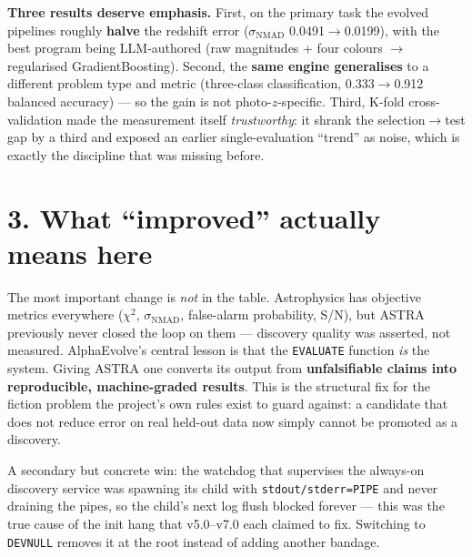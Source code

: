 \documentclass[11pt]{article}
\begin{document}
\textbf{Three results deserve emphasis.} First, on the primary task the evolved
pipelines roughly \textbf{halve} the redshift error ($\sigma_{\mathrm{NMAD}}$
0.0491$\rightarrow$0.0199), with the best program being LLM-authored (raw
magnitudes + four colours $\rightarrow$ regularised GradientBoosting). Second,
the \textbf{same engine generalises} to a different problem type and metric
(three-class classification, 0.333$\rightarrow$0.912 balanced accuracy) --- so
the gain is not photo-$z$-specific. Third, K-fold cross-validation made the
measurement itself \emph{trustworthy}: it shrank the selection$\rightarrow$test
gap by a third and exposed an earlier single-evaluation ``trend'' as noise,
which is exactly the discipline that was missing before.

\section*{3. What ``improved'' actually means here}
The most important change is \emph{not} in the table. Astrophysics has objective
metrics everywhere ($\chi^{2}$, $\sigma_{\mathrm{NMAD}}$, false-alarm
probability, S/N), but ASTRA previously never closed the loop on them ---
discovery quality was asserted, not measured. AlphaEvolve's central lesson is
that the \texttt{EVALUATE} function \emph{is} the system. Giving ASTRA one
converts its output from \textbf{unfalsifiable claims into reproducible,
machine-graded results}. This is the structural fix for the fiction problem the
project's own rules exist to guard against: a candidate that does not reduce
error on real held-out data now simply cannot be promoted as a discovery.

A secondary but concrete win: the watchdog that supervises the always-on
discovery service was spawning its child with \texttt{stdout/stderr=PIPE} and
never draining the pipes, so the child's next log flush blocked forever --- this
was the true cause of the init hang that v5.0--v7.0 each claimed to fix.
Switching to \texttt{DEVNULL} removes it at the root instead of adding another
bandage.
\end{document}
